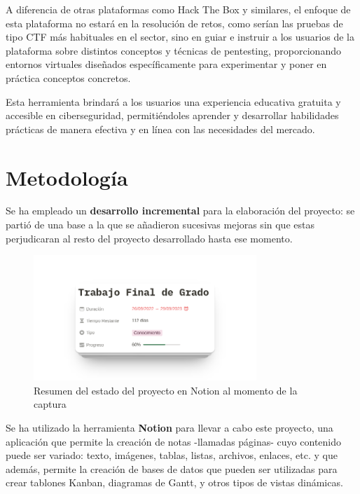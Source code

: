         A diferencia de otras plataformas como Hack The Box y similares, el enfoque de esta plataforma no estará en la resolución de retos, como serían las pruebas de tipo CTF más habituales en el sector, sino en guiar e instruir a los usuarios de la plataforma sobre distintos conceptos y técnicas de pentesting, proporcionando entornos virtuales diseñados específicamente para experimentar y poner en práctica conceptos concretos.
        
        Esta herramienta brindará a los usuarios una experiencia educativa gratuita y accesible en ciberseguridad, permitiéndoles aprender y desarrollar habilidades prácticas de manera efectiva y en línea con las necesidades del mercado.
    
    
    \section{Metodología}
    
        Se ha empleado un \textbf{desarrollo incremental} para la elaboración del proyecto: se partió de una base a la que se añadieron sucesivas mejoras sin que estas perjudicaran al resto del proyecto desarrollado hasta ese momento.

        \begin{figure}[htbp]
            \centering

            \includegraphics[width=0.75\textwidth]{images/Capturas/Notion resumen.png}

            \caption{Resumen del estado del proyecto en Notion al momento de la captura}
            \label{fig:notion-resumen}
        \end{figure}

        Se ha utilizado la herramienta \textbf{Notion} para llevar a cabo este proyecto, una aplicación que permite la creación de notas -llamadas páginas- cuyo contenido puede ser variado: texto, imágenes, tablas, listas, archivos, enlaces, etc. y que además, permite la creación de bases de datos que pueden ser utilizadas para crear tablones Kanban, diagramas de Gantt, y otros tipos de vistas dinámicas.

